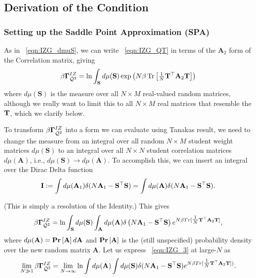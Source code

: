 \subsection{Derivation of the \TRACELOG Condition}
\label{sxn:TraceLogDerivation}


\subsubsection{Setting up the Saddle Point Approximation (SPA)}
\label{sxn:TraceLogDerivation_A}

As in \EQN~\ref{eqn:IZG_dmuS}, 
we can write \EQN~\ref{eqn:IZG_QT} in terms of the $\mathbf{A}_{2}$ form of the \Student Correlation matrix, 
giving
\begin{align}
\beta\mathbf{\Gamma}^{IZ}_{\bar{\mathcal{Q}}^{2}} = \ln\int_{{\mathbf{S}}}  d\mu(\mathbf{S}) \exp\left(N\beta \mbox{}\operatorname{Tr}\left[ \tfrac{1}{N}{\mathbf{T}}^{\top} \mathbf{A}_{2} {\mathbf{T}} \right] \right)
\end{align}
where $d\mu(\mathbf{S})$ is the measure over all $N \times M$ real-valued random matrices,
although we really want to limit this to all $N \times M$ real matrices that resemble the \Teacher ${\mathbf{T}}$,
which we clarify below.

To transform $\beta\mathbf{\Gamma}^{IZ}_{\bar{\mathcal{Q}}^{2}}$ into a form we can evaluate using Tanakas result, 
we need to change the measure from an integral over all random $N \times M$ student weight matrices
$d\mu(\mathbf{S})$ to an integral over all $N \times N$
student correlation matrices $d\mu(\mathbf{A})$, i.e., $d\mu(\mathbf{S})\rightarrow d\mu(\mathbf{A})$.
To accomplish this, we can insert an integral over the Dirac Delta function
\begin{align}
  \label{eqn:I}
  \mathbf{I}:=
  \int d\mu(\mathbf{A}_{1})\delta(N\mathbf{A}_{1}-\mathbf{S}^{\top}\mathbf{S}) =
    \int d\mu(\mathbf{A})\delta(N\mathbf{A}_{1}-\mathbf{S}^{\top}\mathbf{S}).
\end{align}

\noindent
(This is simply a resolution of the Identity.)
This gives
\begin{align}
\label{eqn:IZG_3}
\beta\mathbf{\Gamma}^{IZ}_{\bar{\mathcal{Q}}^{2}}= \ln \int_{{\mathbf{S}}} d\mu(\mathbf{S})\int_{\mathbf{A}} d\mu(\mathbf{A})
           \delta\left( N\mathbf{A}_{1}-\mathbf{S}^{\top}\mathbf{S} \right) 
           e^{ N\beta Tr[\tfrac{1}{N} {\mathbf{T}}^{\top} \mathbf{A}_{2}{\mathbf{T}} ] } ,
\end{align}
where $d\mu(\mathbf{A})=\mbox{}{\bf{Pr}}\left[\mathbf{A}\right]d\mathbf{A}$ and $\mbox{}{\bf{Pr}}\left[\mathbf{A}\right]$ is the
(still unspecified) probability density over the new random matrix $\mathbf{A}$. 
%
Let us express \EQN~\ref{eqn:IZG_3} at large-$N$ as
\begin{align}
  \label{eqn:IZG_4}
  \lim_{N\gg 1}\beta\mathbf{\Gamma}^{IZ}_{\bar{\mathcal{Q}}^{2}} =
  \lim_{N\rightarrow\infty}\ln
  \int d\mu(\mathbf{A})
  \int d\mu(\mathbf{S})
  \delta(N\mathbf{A}_{1}-\mathbf{S}^{\top}\mathbf{S})
  e^{ N\beta Tr[ \tfrac{1}{N}{\mathbf{T}}^{\top}\mathbf{A}_{2}{\mathbf{T}}]) }  .
\end{align}
 
